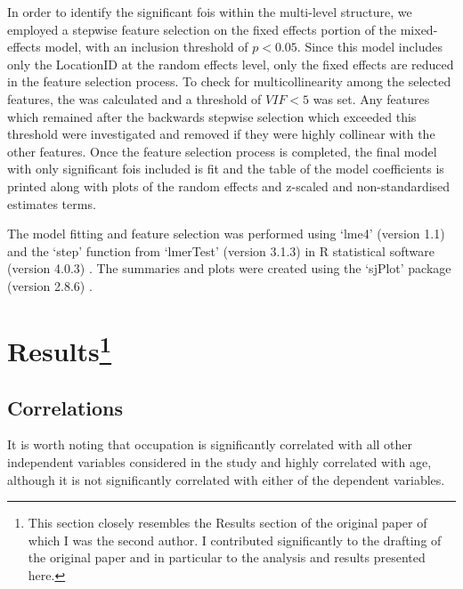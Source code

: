 In order to identify the significant \glspl{foi} within the multi-level structure, we employed a stepwise feature selection on the fixed effects portion of the mixed-effects model, with an inclusion threshold of $p < 0.05$. Since this model includes only the LocationID at the random effects level, only the fixed effects are reduced in the feature selection process. To check for multicollinearity among the selected features, the  was calculated and a threshold of $VIF < 5$ was set. Any features which remained after the backwards stepwise selection which exceeded this threshold were investigated and removed if they were highly collinear with the other features. Once the feature selection process is completed, the final model with only significant \glspl{foi} included is fit and the table of the model coefficients is printed along with plots of the random effects and z-scaled and non-standardised estimates terms. 

The model fitting and feature selection was performed using `lme4' (version 1.1) and the `step' function from `lmerTest' (version 3.1.3)  in R statistical software (version 4.0.3) . The summaries and plots were created using the `sjPlot' package (version 2.8.6) . 

\section[Results]{Results\footnote{This section closely resembles the Results section of the original paper \citep{Erfanian2021Psychological} of which I was the second author. I contributed significantly to the drafting of the original paper and in particular to the analysis and results presented here.}}


\subsection{Correlations}

 It is worth noting that occupation is significantly correlated with all other independent variables considered in the study and highly correlated with age, although it is not significantly correlated with either of the dependent variables.  

